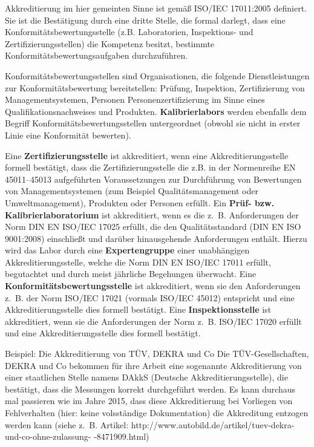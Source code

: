 Akkreditierung im hier gemeinten Sinne ist gemäß ISO/IEC 17011:2005 definiert. Sie ist die Bestätigung durch eine dritte Stelle, die formal darlegt, dass eine Konformitätsbewertungsstelle (z.B. Laboratorien, Inspektions- und Zerti\-fizierungs\-stellen) die Kompetenz besitzt, bestimmte Konformitätsbewertungsaufgaben durchzuführen.

Konformitätsbewertungsstellen sind Organisationen, die folgende Dienstleistungen zur Konformitätsbewertung bereitstellen: Prüfung, Inspektion, Zertifizierung von Managementsystemen, Personen Personenzertifizierung im Sinne eines Qualifikationsnachweises und Produkten. \textbf{Kalibrierlabors} werden ebenfalls dem Begriff Konformitätsbewertungsstellen untergeordnet (obwohl sie nicht in erster Linie eine Konformität bewerten).

Eine \textbf{Zertifizierungsstelle} ist akkreditiert, wenn eine Akkreditierungsstelle formell bestätigt, dass die Zertifizierungsstelle die z.B. in der Normenreihe EN 45011–45013 aufgeführten Voraussetzungen zur Durchführung von Bewertungen von Managementsystemen (zum Beispiel Qualitätsmanagement oder Umweltmanagement), Produkten oder Personen erfüllt.
Ein\textbf{ Prüf- bzw. Kalibrierlaboratorium} ist akkreditiert, wenn es die z.~B. Anforderungen der Norm  DIN EN ISO/IEC 17025 erfüllt, die den Qualitätsstandard (DIN EN ISO 9001:2008) einschließt und darüber hinausgehende Anforderungen enthält. Hierzu wird das Labor durch eine \textbf{Expertengruppe} einer unabhängigen Akkreditierungsstelle, welche die Norm DIN EN ISO/IEC 17011 erfüllt, begutachtet und durch meist jährliche Begehungen überwacht.
Eine \textbf{Konformitätsbewertungsstelle} ist akkreditiert, wenn sie den Anforderungen z.~B. der Norm ISO/IEC 17021 (vormals ISO/IEC 45012) entspricht und eine Akkreditierungsstelle dies formell bestätigt.
Eine \textbf{Inspektionsstelle} ist akkreditiert, wenn sie die Anforderungen der Norm z.~B. ISO/IEC 17020 erfüllt und eine Akkreditierungsstelle dies formell bestätigt.

Beispiel: Die Akkreditierung von TÜV, DEKRA und Co \newline
Die TÜV-Gesellschaften, DEKRA und Co bekommen für ihre Arbeit eine sogenannte Akkreditierung von einer staatlichen Stelle namens DAkkS (Deutsche Akkreditierungsstelle), die bestätigt, dass die Messungen korrekt durchgeführt werden. Es kann durchaus mal passieren wie im
Jahre 2015, dass diese Akkreditierung bei Vorliegen von 
Fehlverhalten (hier: keine volsständige Dokumentation) die Akkreditung entzogen werden kann (siehe z.~B. Artikel: http://www.autobild.de/artikel/tuev-dekra-und-co-ohne-zulassung- -8471909.html)

